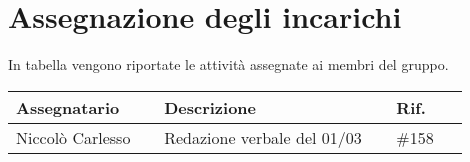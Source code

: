 \section{Assegnazione degli incarichi}
In tabella vengono riportate le attività assegnate ai membri del gruppo.
\begin{center}
	{
		\renewcommand{\arraystretch}{1.5}
		\begin{tabular}{p{0.30\linewidth}|p{0.47\linewidth}|p{0.15\linewidth}}
			\textbf{Assegnatario}	& \textbf{Descrizione}			& \textbf{Rif.} \\
			\hline
			Niccolò Carlesso		& Redazione verbale del 01/03	& \#158			\\
			\hline
		\end{tabular}
	}
\end{center}

